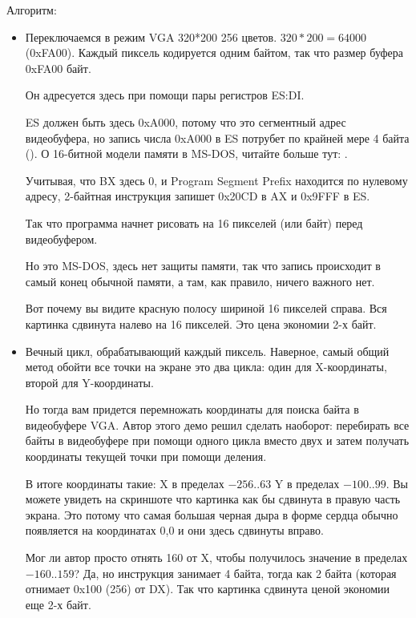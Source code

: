 

Алгоритм:

\begin{itemize}
\item Переключаемся в режим VGA 320*200 256 цветов. 
$320*200=64000$ (0xFA00). 
Каждый пиксель кодируется одним байтом, так что размер буфера 0xFA00 байт.

Он адресуется здесь при помощи пары регистров ES:DI.

ES должен быть здесь 0xA000, потому что это сегментный адрес видеобуфера, но запись
числа 0xA000 в ES потрубет по крайней мере 4 байта (). 
О 16-битной модели памяти в MS-DOS, читайте больше тут: 
.

Учитывая, что BX здесь 0, и Program Segment Prefix находится по нулевому адресу, 2-байтная инструкция
 запишет 0x20CD в AX и 0x9FFF в ES.

Так что программа начнет рисовать на 16 пикселей (или байт) перед видеобуфером.

Но это MS-DOS, 
здесь нет защиты памяти, так что запись происходит в самый конец обычной памяти, а там, как правило, ничего важного нет.

Вот почему вы видите красную полосу шириной 16 пикселей справа.
Вся картинка сдвинута налево на 16 пикселей.
Это цена экономии 2-х байт.

\item Вечный цикл, обрабатывающий каждый пиксель.
Наверное, самый общий метод обойти все точки на экране это два цикла:
один для X-координаты, второй для Y-координаты.

Но тогда вам придется перемножать координаты для поиска байта в видеобуфере VGA.
Автор этого демо решил сделать наоборот: перебирать все байты в видеобуфере при помощи одного цикла
вместо двух и затем получать координаты текущей точки при помощи деления.

В итоге координаты такие: X в пределах $-256..63$ \AndENRU Y 
в пределах $-100..99$.
Вы можете увидеть на скриншоте что картинка как бы сдвинута в правую часть экрана.
Это потому что самая большая черная дыра в форме сердца обычно появляется на координатах 0,0 и они
здесь сдвинуты вправо.

Мог ли автор просто отнять 160 от X, чтобы получилось значение в пределах $-160..159$? 
Да, но инструкция  занимает 4 байта, 
тогда как \EMDASH{}2 байта 
(которая отнимает 0x100 (256) от DX). 
Так что картинка сдвинута ценой экономии еще 2-х байт.


\end{itemize}
